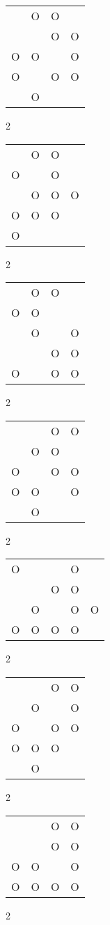 \begin{tabular}{|m{0.2cm}m{0.2cm}m{0.2cm}m{0.2cm}|}\hline
 &O&O& \\
 & &O&O\\
O&O& &O\\
O& &O&O\\
 &O& & \\
\hline\end{tabular}2
\begin{tabular}{|m{0.2cm}m{0.2cm}m{0.2cm}m{0.2cm}|}\hline
 &O&O& \\
O& &O& \\
 &O&O&O\\
O&O&O& \\
O& & & \\
\hline\end{tabular}2
\begin{tabular}{|m{0.2cm}m{0.2cm}m{0.2cm}m{0.2cm}|}\hline
 &O&O& \\
O&O& & \\
 &O& &O\\
 & &O&O\\
O& &O&O\\
\hline\end{tabular}2
\begin{tabular}{|m{0.2cm}m{0.2cm}m{0.2cm}m{0.2cm}|}\hline
 & &O&O\\
 &O&O& \\
O& &O&O\\
O&O& &O\\
 &O& & \\
\hline\end{tabular}2
\begin{tabular}{|m{0.2cm}m{0.2cm}m{0.2cm}m{0.2cm}m{0.2cm}|}\hline
O& & &O& \\
 & &O&O& \\
 &O& &O&O\\
O&O&O&O& \\
\hline\end{tabular}2
\begin{tabular}{|m{0.2cm}m{0.2cm}m{0.2cm}m{0.2cm}|}\hline
 & &O&O\\
 &O& &O\\
O& &O&O\\
O&O&O& \\
 &O& & \\
\hline\end{tabular}2
\begin{tabular}{|m{0.2cm}m{0.2cm}m{0.2cm}m{0.2cm}|}\hline
 & &O&O\\
 & &O&O\\
O&O& &O\\
O&O&O&O\\
\hline\end{tabular}2
